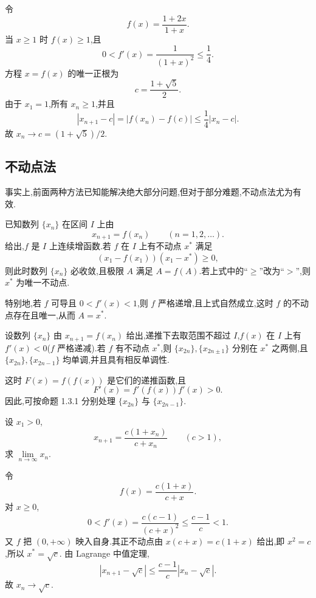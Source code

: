\begin{solution}
  令
  \[
    f(x)=\dfrac{1+2x}{1+x}.
  \]
  当 $x\geq1$ 时 $f(x)\geq1$,且
  \[
    0<f'(x)=\dfrac{1}{(1+x)^2}\leq\dfrac{1}{4}.
  \]
  方程 $x=f(x)$ 的唯一正根为
  \[
    c=\dfrac{1+\sqrt5}{2}.
  \]
  由于 $x_1=1$,所有 $x_n\geq1$,并且
  \[
    |x_{n+1}-c|=|f(x_n)-f(c)|\leq\dfrac{1}{4}|x_n-c|.
  \]
  故 $x_n\to c=(1+\sqrt5)/2$.
\end{solution}



\subsection{不动点法}

事实上,前面两种方法已知能解决绝大部分问题,但对于部分难题,不动点法尤为有效.

\begin{proposition}[\markstar]
  已知数列 $\{x_n\}$ 在区间 $I$ 上由
  \[
    x_{n+1}=f(x_n)\qquad(n=1,2,\ldots).
  \]
  给出,$f$ 是 $I$ 上连续增函数.若 $f$ 在 $I$ 上有不动点 $x^*$ 满足
  \[
    (x_1-f(x_1))(x_1-x^*)\geq0,
  \]
  则此时数列 $\{x_n\}$ 必收敛,且极限 $A$ 满足 $A=f(A)$.若上式中的``$\geq$''改为``$>$'',则 $x^*$ 为唯一不动点.

  特别地,若 $f$ 可导且 $0<f'(x)<1$,则 $f$ 严格递增,且上式自然成立,这时 $f$ 的不动点存在且唯一,从而 $A=x^*$.
\end{proposition}

\begin{proposition}[\markstar]
  设数列 $\{x_n\}$ 由 $x_{n+1}=f(x_n)$ 给出,递推下去取范围不超过 $I$,$f(x)$ 在 $I$ 上有 $f'(x)<0$($f$ 严格递减).若 $f$ 有不动点 $x^*$,则 $\{x_{2n}\},\{x_{2n\pm1}\}$ 分别在 $x^*$ 之两侧,且 $\{x_{2n}\},\{x_{2n-1}\}$ 均单调,并且具有相反单调性.
\end{proposition}

\begin{remark}
  这时 $F(x)=f(f(x))$ 是它们的递推函数,且
  \[
    F'(x)=f'(f(x))f'(x)>0.
  \]
  因此,可按命题 1.3.1 分别处理 $\{x_{2n}\}$ 与 $\{x_{2n-1}\}$.
\end{remark}

\begin{example}
  设 $x_1>0$,
  \[
    x_{n+1}=\dfrac{c(1+x_n)}{c+x_n}\qquad(c>1),
  \]
  求 $\displaystyle \lim\limits_{n\to\infty}x_n$.
\end{example}
\exampleblank

\begin{solution}
  令
  \[
    f(x)=\dfrac{c(1+x)}{c+x}.
  \]
  对 $x\geq0$,
  \[
    0<f'(x)=\dfrac{c(c-1)}{(c+x)^2}\leq\dfrac{c-1}{c}<1.
  \]
  又 $f$ 把 $(0,+\infty)$ 映入自身.其正不动点由
  $x(c+x)=c(1+x)$ 给出,即 $x^2=c$,所以 $x^*=\sqrt c$.
  由 Lagrange 中值定理,
  \[
    |x_{n+1}-\sqrt c|
    \leq\dfrac{c-1}{c}|x_n-\sqrt c|.
  \]
  故 $x_n\to\sqrt c$.
\end{solution}

